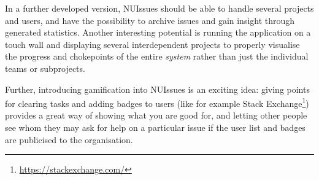In a further developed version, NUIssues should be able to handle several projects and users, and have the possibility to archive issues and gain insight through generated statistics. Another interesting potential is running the application on a touch wall and displaying several interdependent projects to properly visualise the progress and chokepoints of the entire \textit{system} rather than just the individual teams or subprojects.

Further, introducing gamification into NUIssues is an exciting idea: giving points for clearing tasks and adding badges to users (like for example Stack Exchange\footnote{\url{https://stackexchange.com/}}) provides a great way of showing what you are good for, and letting other people see whom they may ask for help on a particular issue if the user list and badges are publicised to the organisation.
